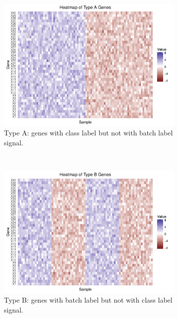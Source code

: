 \documentclass[11pt]{article}
\begin{document}
\begin{figure}[h!]
    \centering
    \begin{subfigure}[t]{0.4\textwidth}
    \includegraphics[width = \textwidth]{figures/Type_A_Gene.pdf}
    \caption{Type A: genes with class label but not with batch label signal.}
    \label{fig:type_a}
    \end{subfigure}
    ~
    \centering
    \begin{subfigure}[t]{0.4\textwidth}
    \includegraphics[width = \textwidth]{figures/Type_B_Gene.pdf}
    \caption{Type B: genes with batch label but not with class label signal.}
    \label{fig:type_b}
    \end{subfigure}
    \\
    \centering
    \begin{subfigure}[t]{0.4\textwidth}

\end{subfigure}
\end{figure}
\end{document}
